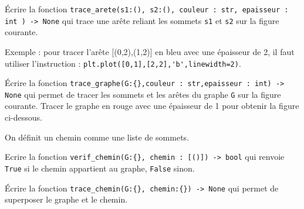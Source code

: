 \begin{question}
Écrire la fonction \lstinline{trace_arete(s1:(), s2:(), couleur : str, epaisseur : int ) -> None} qui trace une arête reliant les sommets \lstinline{s1} et \lstinline{s2} sur la figure courante. 

Exemple : pour tracer l'arête [(0,2),(1,2)] en bleu avec une épaisseur de 2, il faut utiliser l'instruction : \lstinline{plt.plot([0,1],[2,2],'b',linewidth=2)}.
\end{question}


\begin{question}
Écrire la fonction \lstinline|trace_graphe(G:{},couleur : str,epaisseur : int) -> None| qui permet de tracer les sommets et les arêtes du graphe \lstinline{G} sur la figure courante. Tracer le graphe en rouge avec une épaisseur de 1 pour obtenir la figure ci-dessous.
\end{question}


On définit un chemin comme une liste de sommets. 

\begin{question}
Ecrire la fonction \lstinline|verif_chemin(G:{}, chemin : [()]) -> bool| qui renvoie \lstinline{True} si le chemin appartient au graphe, \lstinline{False} sinon.
\end{question}

\begin{question}
Écrire la fonction \lstinline|trace_chemin(G:{}, chemin:{}) -> None| qui permet de superposer le graphe et le chemin.
\end{question}
